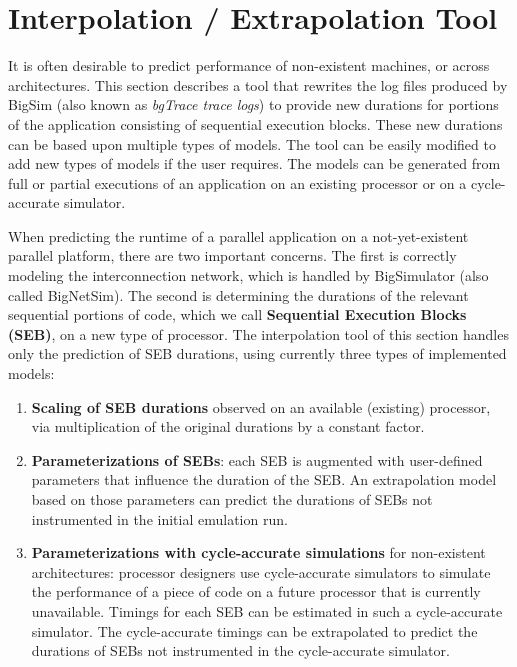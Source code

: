 \section{Interpolation / Extrapolation Tool\label{interpolation}}

It is often desirable to predict performance of non-existent machines, or across architectures.
This section describes a  tool that rewrites the  log files produced by BigSim (also known as {\em bgTrace trace
logs}) to provide new durations for portions of the application consisting of sequential execution blocks.
These new durations can be based upon multiple types of models.
The tool can be easily modified to add new types of models if the user requires.
The models can be generated from full or partial executions of an application on an existing processor or on a
cycle-accurate simulator. 


When predicting the runtime of a parallel application on a not-yet-existent
parallel platform, there are two important concerns. The first is correctly modeling the
interconnection network, which is handled by BigSimulator (also called BigNetSim). 
The second is determining the durations of the relevant sequential portions of code,
which we call \textbf{Sequential Execution Blocks (SEB)}, on a new type of processor.
The interpolation tool of this section handles only the prediction of SEB durations,
using currently three types of implemented models:

\begin{enumerate}
\item \textbf{Scaling of SEB durations} observed on an available (existing) processor, via multiplication of
the original durations by a constant factor.
\item \textbf{Parameterizations of SEBs}: each SEB is augmented with user-defined parameters that
influence the duration of the SEB. An extrapolation model based on those parameters can
predict the durations of SEBs not instrumented in the initial emulation run.
\item \textbf{Parameterizations with cycle-accurate simulations} for non-existent architectures: 
processor designers use cycle-accurate simulators to simulate the performance of a piece of code on
a future processor that is currently unavailable.  Timings for each SEB can be estimated in such a cycle-accurate
simulator. The cycle-accurate timings can be extrapolated to predict the durations of SEBs not instrumented in the
cycle-accurate simulator.
\end{enumerate}

